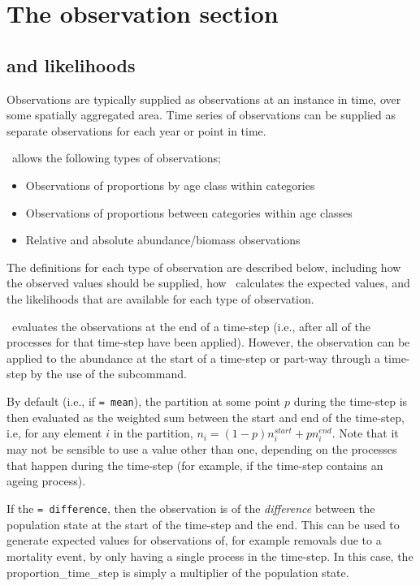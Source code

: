 \section{The observation section\label{sec:observation-section}}

\subsection{ and likelihoods\label{sec:likelihoods}}

Observations are typically supplied as observations at an instance in time, over some spatially aggregated area. Time series of observations can be supplied as separate observations for each year or point in time. 

\iSAM\ allows the following types of observations;
\begin{itemize}
  \item Observations of proportions by age class within categories
  \item Observations of proportions between categories within age classes
  \item Relative and absolute abundance/biomass observations
\end{itemize}

The definitions for each type of observation are described below, including how the observed values should be supplied, how \iSAM\ calculates the expected values, and the likelihoods that are available for each type of observation.

\iSAM\ evaluates the observations at the end of a time-step (i.e., after all of the processes for that time-step have been applied). However, the observation can be applied to the abundance at the start of a time-step or part-way through a time-step by the use of the  subcommand. 

By default (i.e., if  \texttt{= mean}), the partition at some point $p$ during the time-step is then evaluated as the weighted sum between the start and end of the time-step, i.e, for any element $i$ in the partition, $n_i=(1-p) n_i^{start} + p n_i^{end}$. Note that it may not be sensible to use a value other than one, depending on the processes that happen during the time-step (for example, if the time-step contains an ageing process).

If the  \texttt{= difference}, then the observation is of the \emph{difference} between the population state at the start of the time-step and the end. This can be used to generate expected values for observations of, for example removals due to a mortality event, by only having a single process in the time-step. In this case, the proportion\_time\_step is simply a multiplier of the population state.


